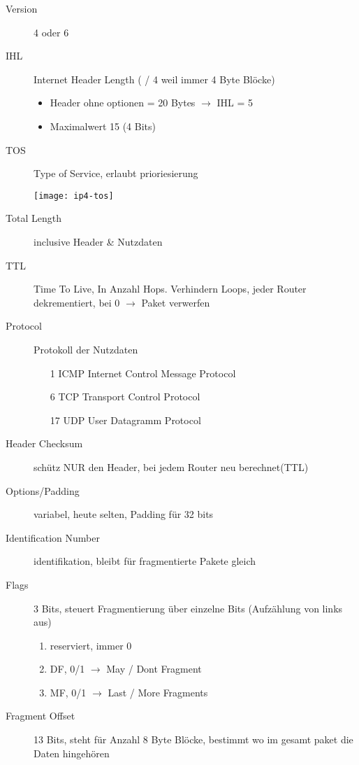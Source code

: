 \begin{description}
    \item[Version] 4 oder 6
    \item[IHL] Internet Header Length ( / 4 weil immer 4 Byte Blöcke)
        \begin{itemize}
            \item Header ohne optionen = 20 Bytes $\rightarrow$ IHL = 5
            \item Maximalwert 15 (4 Bits)
        \end{itemize}
    \item[TOS] Type of Service, erlaubt prioriesierung
        \begin{center}
            \texttt{[image: ip4-tos]}
        \end{center}
    \item[Total Length] inclusive Header \& Nutzdaten
    \item[TTL] Time To Live, In Anzahl Hops. Verhindern Loops, jeder Router
        dekrementiert, bei 0 $\rightarrow$ Paket verwerfen
    \item[Protocol] Protokoll der Nutzdaten
        \begin{enumerate}
            \item[1] ICMP Internet Control Message Protocol
            \item[6] TCP Transport Control Protocol
            \item[17] UDP User Datagramm Protocol
        \end{enumerate}
    \item[Header Checksum] schütz NUR den Header, bei jedem Router neu berechnet(TTL)
    \item[Options/Padding] variabel, heute selten, Padding für 32 bits
    \item[Identification Number] identifikation, bleibt für fragmentierte Pakete gleich
    \item[Flags] 3 Bits, steuert Fragmentierung über einzelne Bits
        (Aufzählung von links aus)
        \begin{enumerate}[start=0]
            \item reserviert, immer 0
            \item DF, 0/1 $\rightarrow$ May / Dont Fragment
            \item MF, 0/1 $\rightarrow$ Last / More Fragments
        \end{enumerate}
    \item[Fragment Offset] 13 Bits, steht für Anzahl 8 Byte Blöcke, bestimmt
        wo im gesamt paket die Daten hingehören
\end{description}


